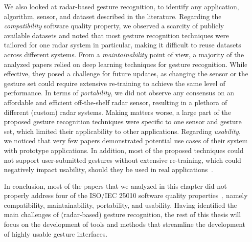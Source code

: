 We also looked at radar-based gesture recognition, to identify any application, algorithm, sensor, and dataset described in the literature. 
%
Regarding the \textit{compatibility} software quality property, we observed a scarcity of publicly available datasets and noted that most gesture recognition techniques were tailored for one radar system in particular, making it difficult to reuse datasets across different systems.
%
From a \textit{maintainability} point of view, a majority of the analyzed papers relied on deep learning techniques for gesture recognition. While effective, they posed a challenge for future updates, as changing the sensor or the gesture set could require extensive re-training to achieve the same level of performance.
%
In terms of \textit{portability}, we did not observe any consensus on an affordable and efficient off-the-shelf radar sensor, resulting in a plethora of different (custom) radar systems. Making matters worse, a large part of the proposed gesture recognition techniques were specific to one sensor and gesture set, which limited their applicability to other applications.
%
Regarding \textit{usability}, we noticed that very few papers demonstrated potential use cases of their system with prototype applications. In addition, most of the proposed techniques could not support user-submitted gestures without extensive re-training, which could negatively impact usability, should they be used in real applications~\cite{Nacenta:2013}.

In conclusion, most of the papers that we analyzed in this chapter did not properly address four of the ISO/IEC 25010 software quality properties~\cite{iso25010}, namely compatibility, maintainability, portability, and usability. 
%
Having identified the main challenges of (radar-based) gesture recognition, the rest of this thesis will focus on the development of tools and methods that streamline the development of highly usable gesture interfaces.





